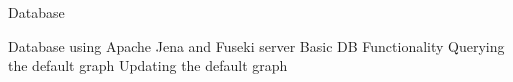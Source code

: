 \begin{frame}{Database}
	\begin{outline}
 \1 Database using Apache Jena and Fuseki server
   \1 Basic DB Functionality
     \2 Querying the default graph
     \2 Updating the default graph
     
\end{outline}
\end{frame}
